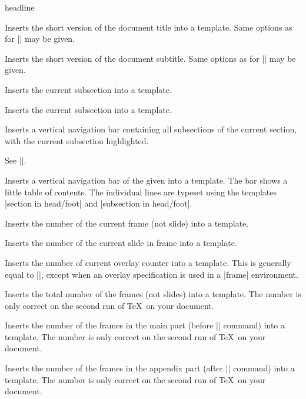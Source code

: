 \begin{element}{headline}
\begin{itemize}
    \iteminsert{\insertshorttitle}
    Inserts the short version of the document title into a template. Same options as for |\insertshortauthor| may be given.

    \iteminsert{\insertshortsubtitle}
    Inserts the short version of the document subtitle. Same options as for |\insertshortauthor| may be given.

    \iteminsert{\insertsubsection}
    Inserts the current subsection into a template.

    \iteminsert{\insertsubsubsection}
    Inserts the current subsection into a template.

    \iteminsert{\insertsubsectionnavigation}
    Inserts a vertical navigation bar containing all subsections of the current section, with the current subsection highlighted.

    \iteminsert{\insertsubsectionnavigationhorizontal}\newline
    See |\insertsectionnavigationhorizontal|.

    \iteminsert{\insertverticalnavigation}
    Inserts a vertical navigation bar of the given  into a template. The bar shows a little table of contents. The individual lines are typeset using the templates |section in head/foot| and |subsection in head/foot|.

    \iteminsert{\insertframenumber}
    Inserts the number of the current frame (not slide) into a template.

    \iteminsert{\insertslidenumber}
    Inserts the number of the current slide in frame into a template.

    \iteminsert{\insertoverlaynumber}
    Inserts the number of current overlay counter into a template. This is generally equal to |\insertslidenumber|, except when an overlay specification is used in a |frame| environment.

    \iteminsert{\inserttotalframenumber}
    Inserts the total number of the frames (not slides) into a template. The number is only correct on the second run of \TeX\ on your document.

    \iteminsert{\insertmainframenumber}
    Inserts the number of the frames in the main part (before |\appendix| command) into a template. The number is only correct on the second run of \TeX\ on your document.

    \iteminsert{\insertappendixframenumber}
    Inserts the number of the frames in the appendix part (after |\appendix| command) into a template. The number is only correct on the second run of \TeX\ on your document.


\end{itemize}
\end{element}
